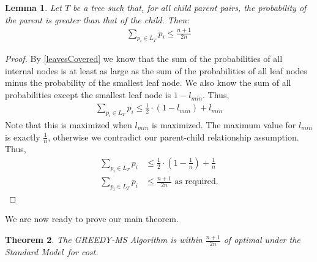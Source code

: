 \documentclass[letterpaper,12pt,titlepage,oneside,final]{book}
\theoremstyle{plain}
\newtheorem{thm}{Theorem}[section]
\newtheorem{lem}[thm]{Lemma}
\begin{document}
\begin{lem}\label{leavesHalf}
Let $T$ be a tree such that, for all child parent pairs, the probability of the parent is greater than that of the child. Then:
\begin{align*}
\sum_{p_i \in L_T} p_i \leq \frac{n+1}{2n}
\end{align*}
\end{lem}
\begin{proof}
By \ref{leavesCovered} we know that the sum of the probabilities of all internal nodes is at least as large as the sum of the probabilities of all leaf nodes minus the probability of the smallest leaf node. We also know the sum of all probabilities except the smallest leaf node is $1-l_{min}$. Thus, 
\begin{align*}
\sum_{p_i \in L_T} p_i \leq \frac{1}{2} \cdot (1-l_{min}) + l_{min}
\end{align*}
\noindent Note that this is maximized when $l_{min}$ is maximized. The maximum value for $l_{min}$ is exactly $\frac{1}{n}$, otherwise we contradict our parent-child relationship assumption. Thus,
\begin{align*}
\sum_{p_i \in L_T} p_i &\leq \frac{1}{2} \cdot (1-\frac{1}{n}) + \frac{1}{n} \\
\sum_{p_i \in L_T} p_i &\leq \frac{n+1}{2n} \text{ as required.}
\end{align*}
\end{proof}


We are now ready to prove our main theorem.

\begin{thm}
The GREEDY-MS Algorithm is within $\frac{n+1}{2n}$ of optimal under the Standard Model\ for cost.
\end{thm}
\end{document}
